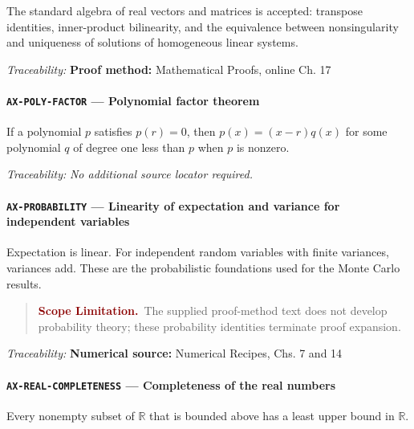 \documentclass[10pt]{article}
\newcommand{\pidraw}[1]{\begingroup\urlstyle{tt}\nolinkurl{#1}\endgroup}
\theoremstyle{definition}
\theoremstyle{remark}
\newenvironment{scopelimitation}
{\begin{quote}\small\noindent\textbf{\textcolor{darkred}{Scope Limitation.}}\ }
{\end{quote}}
\begin{document}
The standard algebra of real vectors and matrices is accepted: transpose identities, inner-product bilinearity, and the equivalence between nonsingularity and uniqueness of solutions of homogeneous linear systems.

\smallskip\noindent\textit{Traceability:} \textbf{Proof method:} Mathematical Proofs, online Ch. 17\par

\label{prf:AX-POLY-FACTOR}

\paragraph{\pidraw{AX-POLY-FACTOR} --- Polynomial factor theorem}

If a polynomial $p$ satisfies $p(r)=0$, then $p(x)=(x-r)q(x)$ for some polynomial $q$ of degree one less than $p$ when $p$ is nonzero.

\smallskip\noindent\textit{Traceability:} \emph{No additional source locator required.}\par

\label{prf:AX-PROBABILITY}

\paragraph{\pidraw{AX-PROBABILITY} --- Linearity of expectation and variance for independent variables}

Expectation is linear. For independent random variables with finite variances, variances add. These are the probabilistic foundations used for the Monte Carlo results.

\begin{scopelimitation}The supplied proof-method text does not develop probability theory; these probability identities terminate proof expansion.\end{scopelimitation}

\smallskip\noindent\textit{Traceability:} \textbf{Numerical source:} Numerical Recipes, Chs. 7 and 14\par

\label{prf:AX-REAL-COMPLETENESS}

\paragraph{\pidraw{AX-REAL-COMPLETENESS} --- Completeness of the real numbers}

Every nonempty subset of $\mathbb{R}$ that is bounded above has a least upper bound in $\mathbb{R}$.
\end{document}
